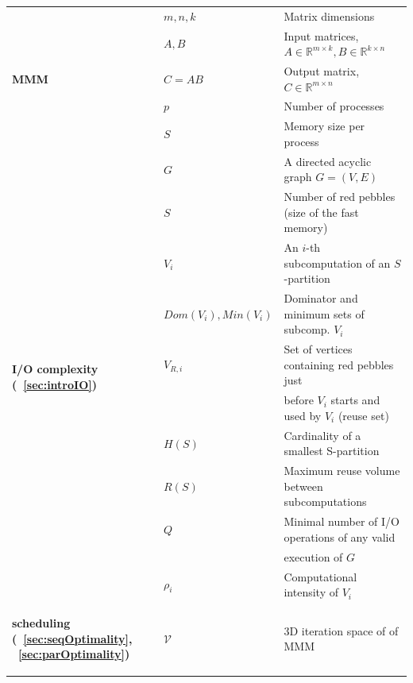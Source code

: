 \documentclass[sigplan,review,anonymous]{acmart}\settopmatter{printfolios=true,printccs=false,printacmref=false}
\begin{document}
\begin{table}[h!]
	\centering
	\scriptsize
	\sf
	\begin{tabular}{@{}l|ll@{}}
		\toprule
		\multirow{5}{*}{\begin{turn}{90}\textbf{MMM}\end{turn}}
		& $m, n, k$& Matrix dimensions \\
		& $A, B$& Input matrices, $A \in \mathbb{R}^{m \times 
		k}, B \in 
		\mathbb{R}^{k \times n}$ \\
		& $C = AB$& Output matrix, $C \in \mathbb{R}^{m 
		\times n}$ \\
		& $p$& Number of processes \\
		& $S$& Memory size per process \\
		\midrule
		\multirow{11}{*}{\begin{turn}{90}\textbf{I/O 
		complexity 
					(~\cref{sec:introIO})}\end{turn}}
		& $G$&A directed acyclic graph $G=(V,E)$\\
		& $S$ & Number of red pebbles (size of the fast 
		memory)\\
		& $V_i$ & An $i$-th subcomputation of an 
		$S$-partition \\
		& $Dom(V_i), Min(V_i)$ & Dominator and minimum sets 
		of subcomp. 
		$V_i$\\
		& $V_{R,i}$ & Set of vertices containing red pebbles 
		just\\
		& &  before $V_i$ starts and used by $V_i$ (reuse 
		set) \\
		& $H(S)$ & Cardinality of a smallest S-partition \\
		& $R(S)$ & Maximum reuse volume between 
		subcomputations \\
		& $Q$ & Minimal number of I/O operations of any valid 
		\\ 
		& & execution of $G$ \\
		& $\rho_i$ & Computational 
		intensity of $V_i$\\
		\midrule
		\multirow{8}{*}{\begin{turn}{90}
				\textbf{scheduling 
				(~\cref{sec:seqOptimality}, 
					~\cref{sec:parOptimality})}
		\end{turn}} 
		& $\mathcal{V}$ & 3D iteration space of of 
		MMM~\cite{tiling}\\         

\end{tabular}
\end{table}
\end{document}
